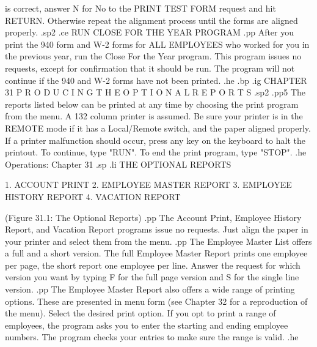 is correct, answer N for No to the PRINT TEST FORM request and hit RETURN.
Otherwise repeat the alignment process until the forms are aligned
properly.
.sp2
.ce
RUN CLOSE FOR THE YEAR PROGRAM
.pp
After you print the 940 form and W-2 forms for ALL EMPLOYEES who worked
for you in the previous year, run the Close For the Year program.
This program issues no requests, except for confirmation that it should
be run.  The program will not continue if the 940 and W-2 forms have
not been printed.
.he
.bp
.ig
CHAPTER 31
P R O D U C I N G   T H E   O P T I O N A L   R E P O R T S
.sp2
.pp5
The reports listed below can be printed at any time by choosing
the print program from the menu.  A 132 column printer
is assumed.  Be sure your printer is in the REMOTE mode if it
has a Local/Remote switch, and the paper aligned properly.  If
a printer malfunction should occur, press any key on the keyboard
to halt the printout.  To continue, type "RUN".  To end the print
program, type "STOP".
.he Operations: Chapter 31
.sp
.li
		   THE OPTIONAL REPORTS

		 1. ACCOUNT PRINT
		 2. EMPLOYEE MASTER REPORT
		 3. EMPLOYEE HISTORY REPORT
		 4. VACATION REPORT

	     (Figure 31.1: The Optional Reports)
.pp
The Account Print, Employee History Report,
and Vacation Report programs issue no requests.  Just align the paper
in your printer and select them from the menu.
.pp
The Employee Master List offers a full and a short version.
The full Employee Master Report prints one employee per page, the
short report one employee per line.  Answer the request for
which version you want by typing F for the full page version and
S for the single line version.
.pp
The Employee Master Report also offers a wide range of printing options.
These are presented in menu form (see Chapter 32 for a reproduction
of the menu).  Select the desired print option.  If you opt to print
a range of employees, the program asks you to enter the starting and
ending employee numbers.  The program checks your entries to make
sure the range is valid.
.he

